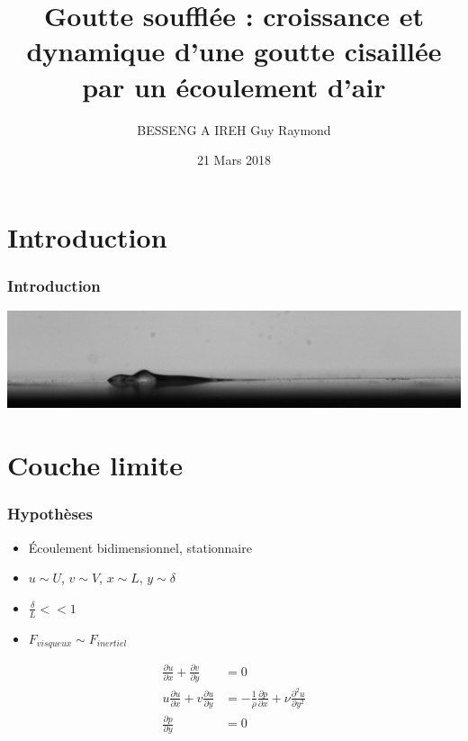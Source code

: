 \documentclass{beamer}
\title[Goutte soufflée]{Goutte soufflée : croissance et dynamique d'une goutte cisaillée par un écoulement d'air\xspace}
\author{BESSENG A IREH Guy Raymond}
\institute[]{Université Paul Sabatier}
\date{21 Mars 2018}
\begin{document}
\maketitle
\section{Introduction}\label{sec:introduction}
\begin{frame}
\frametitle{Introduction}
\begin{center}
\includegraphics[height=0.2\linewidth]{./image/test628.jpg} \\ 
\end{center}
\end{frame}


\section{Couche limite}\label{sec:couche}
\begin{frame}
\frametitle{Hypothèses}
\begin{itemize}
\item Écoulement bidimensionnel, stationnaire
\item $u \sim U$, $v \sim V$, $x \sim L$, $y \sim \delta$
\item $\frac{\delta}{L} << 1$
\item $F_{visqueux} \sim F_{inertiel}$
\end{itemize}
\begin{align}	
	\frac{\partial u}{\partial x} 
	+
	\frac{\partial v}{\partial y} 
	&= 0 \\
	u\frac{\partial u}{\partial x} + 
	v\frac{\partial u}{\partial y} 
	&= - \frac{1}{\rho}
	\frac{\partial p}{\partial  x} +
	\nu
	\frac{\partial^{2} u}{\partial  y^{2}} \\
	\frac{\partial p}{\partial y} 
	&= 0
\end{align}
\end{frame}

\end{document}
